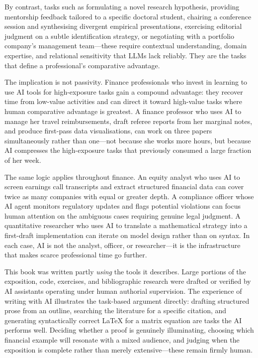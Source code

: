 \begin{context}
By contrast, tasks such as formulating a novel research hypothesis, providing
mentorship feedback tailored to a specific doctoral student, chairing a
conference session and synthesising divergent empirical presentations,
exercising editorial judgment on a subtle identification strategy, or
negotiating with a portfolio company's management team---these require
contextual understanding, domain expertise, and relational sensitivity that
LLMs lack reliably.  They are the tasks that define a professional's
comparative advantage.

The implication is not passivity.  Finance professionals who invest in learning
to use AI tools for high-exposure tasks gain a compound advantage: they recover
time from low-value activities and can direct it toward high-value tasks where
human comparative advantage is greatest.  A finance professor who uses AI to
manage her travel reimbursements, draft referee reports from her marginal notes,
and produce first-pass data visualisations, can work on three papers
simultaneously rather than one---not because she works more hours, but because
AI compresses the high-exposure tasks that previously consumed a large fraction
of her week.

The same logic applies throughout finance.  An equity analyst who uses AI to
screen earnings call transcripts and extract structured financial data can
cover twice as many companies with equal or greater depth.  A compliance officer
whose AI agent monitors regulatory updates and flags potential violations can
focus human attention on the ambiguous cases requiring genuine legal judgment.
A quantitative researcher who uses AI to translate a mathematical strategy into
a first-draft implementation can iterate on model design rather than on syntax.
In each case, AI is not the analyst, officer, or researcher---it is the
infrastructure that makes scarce professional time go further.

\begin{remark}
\label{rem:this-book-ai}
This book was written partly \emph{using} the tools it describes.  Large
portions of the exposition, code, exercises, and bibliographic research were
drafted or verified by AI assistants operating under human authorial supervision.
The experience of writing with AI illustrates the task-based argument directly:
drafting structured prose from an outline, searching the literature for a
specific citation, and generating syntactically correct \LaTeX{} for a matrix
equation are tasks the AI performs well.  Deciding whether a proof is
genuinely illuminating, choosing which financial example will resonate with
a mixed audience, and judging when the exposition is complete rather than
merely extensive---these remain firmly human.
\end{remark}

\end{context}

